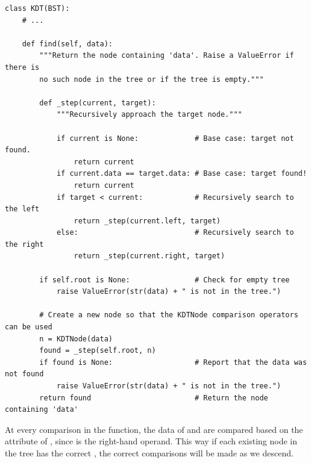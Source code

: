 \begin{lstlisting}
class KDT(BST):
	# ...

	def find(self, data):
		"""Return the node containing 'data'. Raise a ValueError if there is
		no such node in the tree or if the tree is empty."""
		
		def _step(current, target):
			"""Recursively approach the target node."""
			
			if current is None:				# Base case: target not found.
				return current
			if current.data == target.data:	# Base case: target found!
				return current
			if target < current:			# Recursively search to the left
				return _step(current.left, target)
			else:							# Recursively search to the right
				return _step(current.right, target)
			
		if self.root is None:				# Check for empty tree
			raise ValueError(str(data) + " is not in the tree.")
		
		# Create a new node so that the KDTNode comparison operators can be used
		n = KDTNode(data)
		found = _step(self.root, n)
		if found is None:					# Report that the data was not found
			raise ValueError(str(data) + " is not in the tree.")
		return found						# Return the node containing 'data'
\end{lstlisting}

At every comparison in the  function, the data of  and  are compared based on the  attribute of , since  is the right-hand operand.
This way if each existing node in the tree has the correct , the correct comparisons will be made as we descend.

